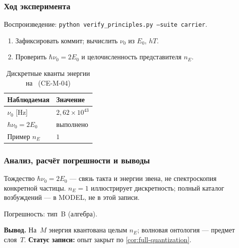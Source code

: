 \subsubsection*{Ход эксперимента}
Воспроизведение: \texttt{python verify\_principles.py --suite carrier}.

\begin{enumerate}[label=\textbf{Шаг \arabic*:},leftmargin=*,itemsep=0.35em]
\item Зафиксировать коммит; вычислить $\nu_0$ из $E_0$, $hT$.
\item Проверить $\hbar\nu_0=2E_0$ и целочисленность представителя $n_E$.
\end{enumerate}

\begin{table}[htbp]
\centering
\small
\caption{Дискретные кванты энергии на \Mlayer\ (CE-M-04)}
\label{tab:exp-ce-m-04}
\begin{tabular}{@{}ll@{}}
\toprule
Наблюдаемая & Значение \\
\midrule
$\nu_0$ [Hz] & $2{,}62\times 10^{43}$ \\
$\hbar\nu_0=2E_0$ & выполнено \\
Пример $n_E$ & $1$ \\
\bottomrule
\end{tabular}
\end{table}

\subsubsection*{Анализ, расчёт погрешности и выводы}
Тождество $\hbar\nu_0=2E_0$ --- связь такта и энергии звена, не спектроскопия конкретной частицы.
$n_E=1$ иллюстрирует дискретность; полный каталог возбуждений --- в MODEL, не в этой записи.

Погрешность: тип~B (алгебра).

\textbf{Вывод.}
На~$M$ энергия квантована целым $n_E$; волновая онтология --- предмет слоя~$T$.
\textbf{Статус записи:} опыт закрыт по \cref{cor:full-quantization}.
